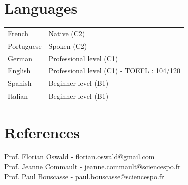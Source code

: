 \documentclass[a4paper,12pt]{article}
\begin{document}
\section{Languages}
\begin{tabularx}{\linewidth}{@{}l X@{}}
French &  \normalsize{Native (C2)}\\
Portuguese &  \normalsize{Spoken (C2)}\\
German &  \normalsize{Professional level (C1)}\\  
English &  \normalsize{Professional level (C1) - TOEFL : 104/120}\\ 
Spanish & \normalsize{Beginner level (B1)}\\ 
Italian & \normalsize{Beginner level (B1)}\\ 
\end{tabularx}

\section{References}

\href{https://floswald.github.io}{Prof. Florian Oswald} - florian.oswald@gmail.com \\
\href{https://www.jcommault.com}{Prof. Jeanne Commault} - jeanne.commault@sciencespo.fr \\
\href{https://www.paul-bouscasse.com}{Prof. Paul Bouscasse} - paul.bouscasse@sciencespo.fr \\

\vfill
{}
\end{document}
